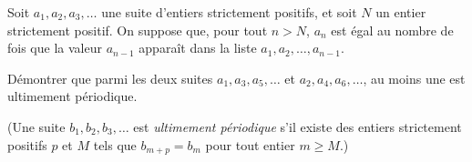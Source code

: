 Soit $a_1, a_2, a_3, \ldots$ une suite d'entiers strictement positifs, et soit $N$ un entier strictement
positif. On suppose que, pour tout $n > N$, $a_n$ est égal au nombre de fois que la valeur $a_{n-1}$
apparaît dans la liste $a_1, a_2, \ldots, a_{n-1}$.

Démontrer que parmi les deux suites $a_1, a_3, a_5, \ldots$ et $a_2, a_4, a_6, \ldots$, au moins une est
ultimement périodique.

(Une suite $b_1, b_2, b_3, \ldots$ est \emph{ultimement périodique} s'il existe des entiers strictement
positifs $p$ et $M$ tels que $b_{m+p} = b_m$ pour tout entier $m \geqslant M$.)
